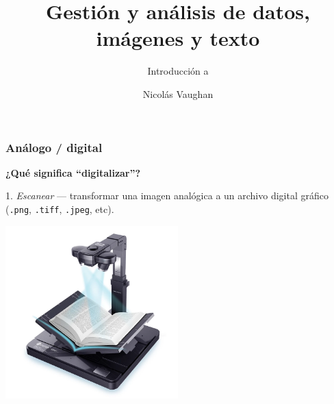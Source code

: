 \documentclass[%
  handout, %
  xcolor=svgnames]{beamer}
\title{Gestión y análisis de datos, imágenes y texto}
\subtitle{Introducción a \TEI}
\author{Nicolás Vaughan}
\institute[UA]
{\footnotesize
Universidad de los Andes \\
\medskip
\texttt{n.vaughan@uniandes.edu.co}
}
\date[\tiny\mydate]{\scriptsize\mydate}
\newcommand*{\rojo}[1]{\textcolor[HTML]{8B0000}{#1}}
\newcommand*{\rojoit}[1]{\textit{\textcolor[HTML]{8B0000}{#1}}}
\newcommand{\Azul}{\color[HTML]{14145A}}
\begin{document}
\begin{frame}
  \titlepage
\end{frame}



\begin{frame}
  \frametitle{Análogo / digital}
  
  {\large\Azul\textbf{¿Qué significa \enquote{digitalizar}?}}

  \bigskip

  \rojo{1.} \rojoit{Escanear} --- transformar una imagen analógica a un archivo digital gráfico (\texttt{.png}, \texttt{.tiff}, \texttt{.jpeg}, etc).

  \begin{center}
    \includegraphics[width=0.5\textwidth]{img/scanning.png}
  \end{center}

\end{frame}
\end{document}
